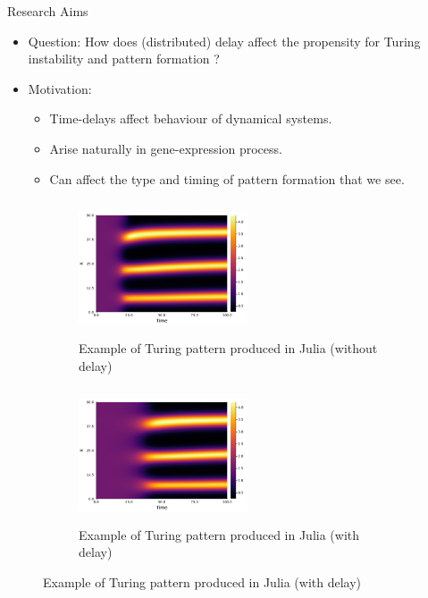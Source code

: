 \documentclass{beamer}
\begin{document}
\begin{frame}{Research Aims}
\begin{itemize}
  \item Question: How does (distributed) delay affect the propensity for Turing instability and pattern formation ?

  \item Motivation:\begin{itemize}
  \item Time-delays affect behaviour of dynamical systems.
  \item Arise naturally in gene-expression process.
  \item Can affect the type and timing of pattern formation that we see.
\end{itemize}
\end{itemize}

\begin{figure}[H]
    \begin{subfigure}[b]{0.45\linewidth}
        \centering
        \includegraphics[width=5cm,height=4cm]{NoDelaySpatial.png}
        \caption{Example of Turing pattern produced in Julia (without delay)}
    \end{subfigure}
    \begin{subfigure}[b]{0.45\linewidth}
        \centering
        \includegraphics[width=5cm,height=4cm]{Fixedτ0.2.png}
        \caption{Example of Turing pattern produced in Julia (with delay)}
    \end{subfigure}
\end{figure}
\end{frame}
\end{document}
